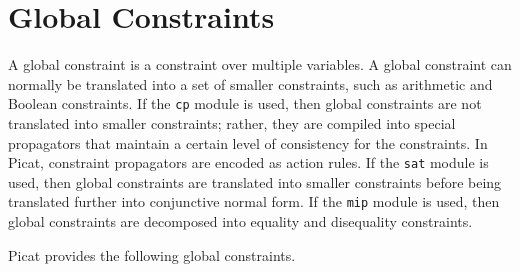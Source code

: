 \section{Global Constraints}
A global constraint is a constraint over multiple variables. A global constraint can normally be translated into a set of smaller constraints, such as arithmetic and Boolean constraints. If the \texttt{cp} module is used, then global constraints are not translated into smaller constraints; rather, they are compiled into special propagators that maintain a certain level of consistency for the constraints. In Picat, constraint propagators are encoded as action rules. If the \texttt{sat} module is used, then global constraints are translated into smaller constraints before being translated further into conjunctive normal form. If the \texttt{mip} module is used, then global constraints are decomposed into equality and disequality constraints.

Picat provides the following global constraints.

